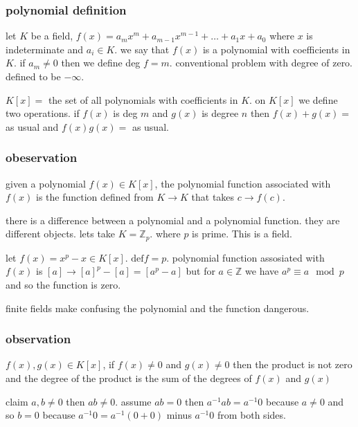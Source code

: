 \documentclass[letterpaper]{article}
\begin{document}
\subsubsection*{polynomial definition}
let $K$ be a field, $f(x)=a_mx^m+a_{m-1}x^{m-1}+\dots+a_1x+a_0$ where $x$ is indeterminate and $a_i\in K$. we say that $f(x)$ is a polynomial with coefficients in $K$. if $a_m\ne 0$ then we define deg $f=m$. conventional problem with degree of zero. defined to be $-\infty$.

$K[x]=$ the set of all polynomials with coefficients in $K$. on $K[x]$ we define two operations. if $f(x)$ is deg $m$ and $g(x)$ is degree $n$ then $f(x)+g(x)=$ as usual and $f(x)g(x)=$ as usual.

\subsubsection*{obeservation}
given a polynomial $f(x)\in K[x]$, the polynomial function associated with $f(x)$ is the function defined from $K\to K$ that takes $c\to f(c)$.

there is a difference between a polynomial and a polynomial function. they are different objects. lets take $K=\mathbb{Z}_p$. where $p$ is prime. This is a field.

let $f(x)=x^{p}-x\in K[x]$. $\text{def} f=p$. polynomial function assosiated with $f(x)$ is $[a]\to[a]^p-[a]=[a^p-a]$ but for $a\in \mathbb{Z}$ we have $a^p\equiv a\mod p$ and so the function is zero.

finite fields make confusing the polynomial and the function dangerous.

\subsubsection*{observation}
$f(x),g(x)\in K[x]$, if $f(x)\ne 0$ and $g(x)\ne 0$ then the product is not zero and the degree of the product is the sum of the degrees of $f(x)$ and $g(x)$

claim $a,b\ne0$ then $ab\ne 0$. assume $ab=0$ then $a^{-1}ab=a^{-1}0$ because $a\ne 0$ and so $b=0$ because $a^{-1}0=a^{-1}(0+0)$ minus $a^{-1}0$ from both sides.
\end{document}
